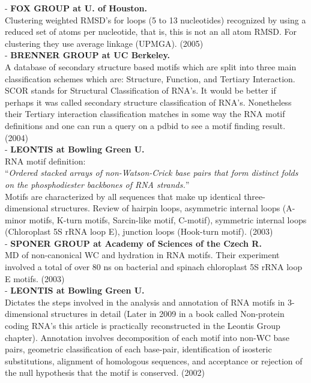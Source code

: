 - \textbf{FOX GROUP at U. of Houston.}\\
Clustering weighted RMSD's  for loops (5 to 13 nucleotides) recognized
by using a reduced set of atoms per nucleotide, that is, this is not
an all atom RMSD. For clustering they use average linkage
(UPMGA). (2005)
\cite{huang2005}\\

- \textbf{BRENNER GROUP at UC Berkeley.}\\
A database of secondary structure based motifs which are split into
three main classification schemes which are: Structure, Function, and
Tertiary Interaction. SCOR stands for Structural Classification of
RNA's. It would be better if perhaps it was called secondary
structure classification of RNA's. Nonetheless their Tertiary
interaction classification matches in some way the RNA motif
definitions and one can run a query on a pdbid to see a motif finding
result. (2004)
\cite{klosterman2004}\\

- \textbf{LEONTIS at Bowling Green U.}\\
RNA motif definition:\\
``\textit{Ordered stacked arrays of non-Watson-Crick  base  pairs  that  form
distinct  folds  on  the phosphodiester  backbones of  RNA strands.}''\\
Motifs  are characterized  by  all sequences  that  make up  identical
three-dimensional structures.  Review  of hairpin
loops,  asymmetric  internal  loops  (A-minor motifs,  K-turn  motifs,
Sarcin-like motif, C-motif),  symmetric internal loops (Chloroplast 5S
rRNA loop E), junction loops (Hook-turn motif). (2003)
\cite{leontis2003}\\

- \textbf{SPONER GROUP at Academy of Sciences of the Czech R.}\\
MD of non-canonical WC and hydration in RNA  motifs. Their experiment involved a total
of over  80 ns on  bacterial and spinach  chloroplast 5S rRNA  loop E
motifs. (2003)
\cite{reblova2003}\\

- \textbf{LEONTIS at Bowling Green U.}\\
Dictates the  steps involved  in the analysis  and annotation  of RNA
motifs in 3-dimensional  structures in detail (Later in 2009 in a book
called Non-protein coding RNA's this article is practically
reconstructed in the Leontis Group chapter). Annotation involves decomposition
of each motif into non-WC base pairs, geometric classification of each
base-pair,  identification  of  isosteric substitutions,  alignment  of
homologous  sequences,  and  acceptance   or  rejection  of  the  null
hypothesis that the motif is conserved. (2002)
\cite{leontis2002b}\\

